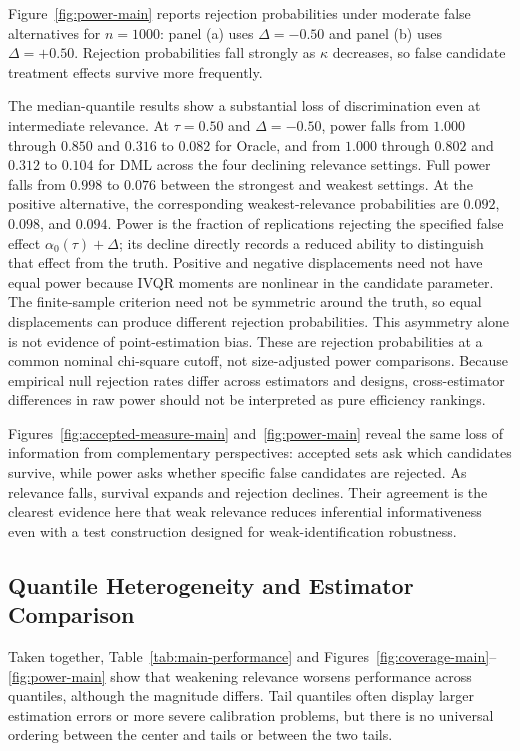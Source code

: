 Figure~\ref{fig:power-main} reports rejection probabilities under moderate false alternatives for $n=1000$: panel (a) uses $\Delta=-0.50$ and panel (b) uses $\Delta=+0.50$. Rejection probabilities fall strongly as $\kappa$ decreases, so false candidate treatment effects survive more frequently.



The median-quantile results show a substantial loss of discrimination even at intermediate relevance. At $\tau=0.50$ and $\Delta=-0.50$, power falls from $1.000$ through $0.850$ and $0.316$ to $0.082$ for Oracle, and from $1.000$ through $0.802$ and $0.312$ to $0.104$ for DML across the four declining relevance settings. Full power falls from $0.998$ to $0.076$ between the strongest and weakest settings. At the positive alternative, the corresponding weakest-relevance probabilities are $0.092$, $0.098$, and $0.094$. Power is the fraction of replications rejecting the specified false effect $\alpha_0(\tau)+\Delta$; its decline directly records a reduced ability to distinguish that effect from the truth. Positive and negative displacements need not have equal power because IVQR moments are nonlinear in the candidate parameter. The finite-sample criterion need not be symmetric around the truth, so equal displacements can produce different rejection probabilities. This asymmetry alone is not evidence of point-estimation bias. These are rejection probabilities at a common nominal chi-square cutoff, not size-adjusted power comparisons. Because empirical null rejection rates differ across estimators and designs, cross-estimator differences in raw power should not be interpreted as pure efficiency rankings.

Figures~\ref{fig:accepted-measure-main} and~\ref{fig:power-main} reveal the same loss of information from complementary perspectives: accepted sets ask which candidates survive, while power asks whether specific false candidates are rejected. As relevance falls, survival expands and rejection declines. Their agreement is the clearest evidence here that weak relevance reduces inferential informativeness even with a test construction designed for weak-identification robustness.

\subsection{Quantile Heterogeneity and Estimator Comparison}

Taken together, Table~\ref{tab:main-performance} and Figures~\ref{fig:coverage-main}--\ref{fig:power-main} show that weakening relevance worsens performance across quantiles, although the magnitude differs. Tail quantiles often display larger estimation errors or more severe calibration problems, but there is no universal ordering between the center and tails or between the two tails.

